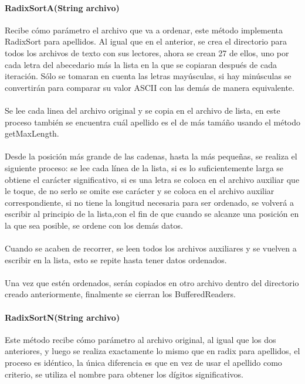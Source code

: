\documentclass[11pt]{article}
\begin{document}
\paragraph{RadixSortA(String archivo)}
Recibe cómo parámetro el archivo que va a ordenar, este método implementa RadixSort para apellidos.
Al igual que en el anterior, se crea el directorio para todos los archivos de texto con sus lectores, ahora se crean 27 de ellos, uno por cada letra del abecedario más la lista en la que se copiaran después de cada iteración. Sólo se tomaran en cuenta las letras mayúsculas, si hay minúsculas se convertirán para comparar su valor ASCII con las demás de manera equivalente.  
\paragraph{}
Se lee cada linea del archivo original y se copia en el archivo de lista, en este proceso también se encuentra cuál apellido es el de más tamáño usando el método getMaxLength.
\paragraph{}
Desde la posición más grande de las cadenas, hasta la más pequeñas, se realiza el siguiente proceso: se lee cada línea de la lista, si es lo suficientemente larga se obtiene el carácter significativo, si es una letra se coloca en el archivo auxiliar que le toque, de no serlo se omite ese carácter y se coloca en el archivo auxiliar correspondiente, si no tiene la longitud necesaria para ser ordenado, se volverá a escribir al principio de la lista,con el fin de que cuando se alcanze una posición en la que sea posible, se ordene con los demás datos. 
\paragraph{}
Cuando se acaben de recorrer, se leen todos los archivos auxiliares y se vuelven a escribir en la lista, esto se repite hasta tener datos ordenados.
\paragraph{} Una vez que estén ordenados, serán copiados en otro archivo dentro del directorio creado anteriormente, finalmente se cierran los BufferedReaders. 

\paragraph{RadixSortN(String archivo)}
Este método recibe cómo parámetro al archivo original, al igual que los dos anteriores, y luego se realiza exactamente lo mismo que en radix para apellidos, el proceso es idéntico, la única diferencia es que en vez de usar el apellido como criterio, se utiliza el nombre para obtener los dígitos significativos. 
\end{document}
